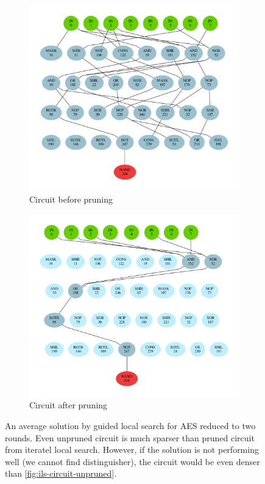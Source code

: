 \documentclass[
  print, %
  Table,   %
  nolof,     %
  nolot,     %
  11pt, %
  oneside  %
]{fithesis3}
\begin{document}
\begin{figure}
\begin{changemargin}{-3cm}{-3cm}
\centering
\begin{subfigure}{.6\textwidth}
  \centering
  \includegraphics[width=\textwidth]{./graphics/gls/circuit}
  \caption{Circuit before pruning}
  \label{fig:gls-circuit-unpruned}
\end{subfigure}%
\begin{subfigure}{.6\textwidth}
  \centering
  \includegraphics[width=\textwidth]{./graphics/gls/pruned}
  \caption{Circuit after pruning}
  \label{fig:gls-circuit-pruned}
\end{subfigure}
\end{changemargin}
\caption{An average solution by guided local search for AES reduced to two rounds. Even unpruned circuit is much sparser than pruned circuit from iteratel local search. However, if the solution is not performing well (we cannot find distinguisher), the circuit would be even denser than \cref{fig:ils-circuit-unpruned}.}
\label{fig:gls-circuits}
\end{figure}
\end{document}
